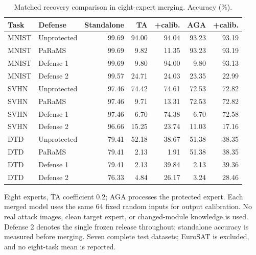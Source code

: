 \begin{table}[t]
\centering\small
\setlength{\tabcolsep}{4pt}
\caption{Matched recovery comparison in eight-expert merging. Accuracy (\%).}
\label{tab:eight_calibration_target}
\begin{tabular}{@{}llrrrrr@{}}
\toprule
Task & Defense & Standalone & TA & +calib. & AGA & +calib. \\
\midrule
MNIST & Unprotected & 99.69 & 94.00 & 94.04 & 93.23 & 93.19 \\
MNIST & PaRaMS & 99.69 & 9.82 & 11.35 & 93.23 & 93.19 \\
MNIST & Defense 1 & 99.69 & 9.80 & 94.00 & 9.80 & 93.13 \\
MNIST & Defense 2 & 99.57 & 24.71 & 24.03 & 23.35 & 22.99 \\
\midrule
SVHN & Unprotected & 97.46 & 74.42 & 74.61 & 72.53 & 72.82 \\
SVHN & PaRaMS & 97.46 & 9.71 & 13.31 & 72.53 & 72.82 \\
SVHN & Defense 1 & 97.46 & 6.70 & 74.38 & 6.70 & 72.58 \\
SVHN & Defense 2 & 96.66 & 15.25 & 23.74 & 11.03 & 17.16 \\
\midrule
DTD & Unprotected & 79.41 & 52.18 & 38.67 & 51.38 & 38.35 \\
DTD & PaRaMS & 79.41 & 2.13 & 1.91 & 51.38 & 38.35 \\
DTD & Defense 1 & 79.41 & 2.13 & 39.84 & 2.13 & 39.36 \\
DTD & Defense 2 & 76.33 & 4.84 & 26.17 & 3.24 & 28.46 \\
\bottomrule
\end{tabular}
\par\smallskip
\begin{minipage}{\textwidth}\footnotesize Eight experts, TA coefficient 0.2; AGA processes the protected expert. Each merged model uses the same 64 fixed random inputs for output calibration. No real attack images, clean target expert, or changed-module knowledge is used. Defense 2 denotes the single frozen release throughout; standalone accuracy is measured before merging. Seven complete test datasets; EuroSAT is excluded, and no eight-task mean is reported.\end{minipage}
\end{table}
